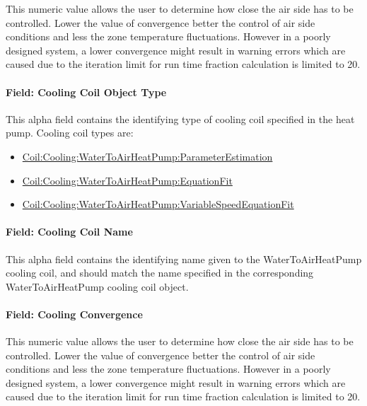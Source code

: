 This numeric value allows the user to determine how close the air side has to be controlled. Lower the value of convergence better the control of air side conditions and less the zone temperature fluctuations. However in a poorly designed system, a lower convergence might result in warning errors which are caused due to the iteration limit for run time fraction calculation is limited to 20.

\paragraph{Field: Cooling Coil Object Type}\label{field-cooling-coil-object-type-5}

This alpha field contains the identifying type of cooling coil specified in the heat pump. Cooling coil types are:

\begin{itemize}
\item
  \hyperref[coilcoolingwatertoairheatpumpparameterestimation]{Coil:Cooling:WaterToAirHeatPump:ParameterEstimation}
\item
  \hyperref[coilcoolingwatertoairheatpumpequationfit]{Coil:Cooling:WaterToAirHeatPump:EquationFit}
\item
  \hyperref[coilcoolingwatertoairheatpumpvariablespeedequationfit]{Coil:Cooling:WaterToAirHeat\hyperref[pumpvariablespeed]{Pump:VariableSpeed}EquationFit}
\end{itemize}

\paragraph{Field: Cooling Coil Name}\label{field-cooling-coil-name-5}

This alpha field contains the identifying name given to the WaterToAirHeatPump cooling coil, and should match the name specified in the corresponding WaterToAirHeatPump cooling coil object.

\paragraph{Field: Cooling Convergence}\label{field-cooling-convergence}

This numeric value allows the user to determine how close the air side has to be controlled. Lower the value of convergence better the control of air side conditions and less the zone temperature fluctuations. However in a poorly designed system, a lower convergence might result in warning errors which are caused due to the iteration limit for run time fraction calculation is limited to 20.

